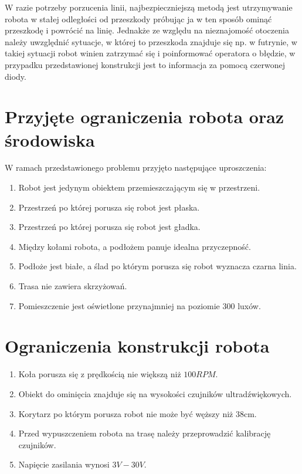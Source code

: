 W razie potrzeby porzucenia linii, najbezpieczniejszą metodą jest utrzymywanie robota w stałej odległości od przeszkody próbując ja w ten sposób ominąć przeszkodę i powrócić na linię. Jednakże ze względu na nieznajomość otoczenia należy uwzględnić sytuacje, w której to przeszkoda znajduje się np. w futrynie, w takiej sytuacji robot winien zatrzymać się i poinformować operatora o błędzie, w przypadku przedstawionej konstrukcji jest to informacja za pomocą czerwonej diody.

\section{Przyjęte ograniczenia robota oraz środowiska}
W ramach przedstawionego problemu przyjęto następujące uproszczenia:
\begin{enumerate}
    \item Robot jest jedynym obiektem przemieszczającym się w przestrzeni.
    \item Przestrzeń po której porusza się robot jest płaska.
    \item Przestrzeń po której porusza się robot jest gładka.
    \item Między kołami robota, a podłożem panuje idealna przyczepność.
    \item Podłoże jest białe, a ślad po którym porusza się robot wyznacza czarna linia.
    \item Trasa nie zawiera skrzyżowań.
    \item Pomieszczenie jest oświetlone przynajmniej na poziomie 300 luxów.
\end{enumerate}

\section{Ograniczenia konstrukcji robota}
\begin{enumerate}
    \item Koła porusza się z prędkością nie większą niż $100RPM$.
    \item Obiekt do ominięcia znajduje się na wysokości czujników ultradźwiękowych.
    \item Korytarz po którym porusza robot nie może być węższy niż 38cm.
    \item Przed wypuszczeniem robota na trasę należy przeprowadzić kalibrację czujników.
    \item Napięcie zasilania wynosi $3V-30V$.
\end{enumerate}